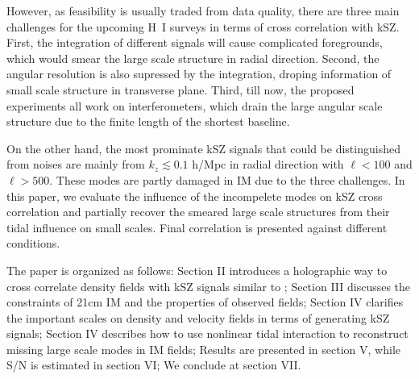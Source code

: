 However, as feasibility is usually traded from data quality, 
there are three main challenges for the upcoming H~I surveys  
in terms of cross correlation with kSZ. 
First, the integration of different signals will cause complicated foregrounds, 
which would smear the large scale structure in radial direction\cite{DiMatteo04,Masui13}. 
Second, the angular resolution is also supressed by the integration, 
droping information of small scale structure in transverse plane. 
Third, till now, the proposed experiments all work on interferometers, 
which drain the large angular scale structure  
due to the finite length of the shortest baseline. 

On the other hand, the most prominate kSZ signals that could be distinguished from noises  
are mainly from $k_z\lesssim0.1$ h/Mpc in radial direction 
with $\ell < 100$ and $\ell > 500$. 
These modes are partly damaged in IM due to the three challenges. 
In this paper, we evaluate the 
influence of the incompelete modes on kSZ cross correlation 
and partially recover the smeared large scale structures 
from their tidal influence on small scales\cite{2012:pen,2015:zhu}. 
Final correlation is presented against different conditions.

The paper is organized as follows: 
Section II introduces a holographic way to 
cross correlate density fields with kSZ signals similar to \cite{Shao11}; 
Section III discusses the constraints of 21cm IM and the properties of observed fields; 
Section IV clarifies the important scales on density and velocity fields in terms of generating 
kSZ signals; 
Section IV describes how to use nonlinear tidal interaction 
to reconstruct missing large scale modes in IM fields; 
Results are presented in section V, 
while S/N is estimated in section VI; 
We conclude at section VII.
